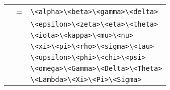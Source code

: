 \begin{isabellebody}
\begin{isamarkuptext}
\begin{center}
\begin{supertabular}{rcl}
     & = & \verb|\<alpha>|\isa{{\isachardoublequote}\ \ {\isacharbar}\ \ {\isachardoublequote}}\verb|\<beta>|\isa{{\isachardoublequote}\ \ {\isacharbar}\ \ {\isachardoublequote}}\verb|\<gamma>|\isa{{\isachardoublequote}\ \ {\isacharbar}\ \ {\isachardoublequote}}\verb|\<delta>|\isa{{\isachardoublequote}\ \ {\isacharbar}{\isachardoublequote}} \\
          &   & \verb|\<epsilon>|\isa{{\isachardoublequote}\ \ {\isacharbar}\ \ {\isachardoublequote}}\verb|\<zeta>|\isa{{\isachardoublequote}\ \ {\isacharbar}\ \ {\isachardoublequote}}\verb|\<eta>|\isa{{\isachardoublequote}\ \ {\isacharbar}\ \ {\isachardoublequote}}\verb|\<theta>|\isa{{\isachardoublequote}\ \ {\isacharbar}{\isachardoublequote}} \\
          &   & \verb|\<iota>|\isa{{\isachardoublequote}\ \ {\isacharbar}\ \ {\isachardoublequote}}\verb|\<kappa>|\isa{{\isachardoublequote}\ \ {\isacharbar}\ \ {\isachardoublequote}}\verb|\<mu>|\isa{{\isachardoublequote}\ \ {\isacharbar}\ \ {\isachardoublequote}}\verb|\<nu>|\isa{{\isachardoublequote}\ \ {\isacharbar}{\isachardoublequote}} \\
          &   & \verb|\<xi>|\isa{{\isachardoublequote}\ \ {\isacharbar}\ \ {\isachardoublequote}}\verb|\<pi>|\isa{{\isachardoublequote}\ \ {\isacharbar}\ \ {\isachardoublequote}}\verb|\<rho>|\isa{{\isachardoublequote}\ \ {\isacharbar}\ \ {\isachardoublequote}}\verb|\<sigma>|\isa{{\isachardoublequote}\ \ {\isacharbar}\ \ {\isachardoublequote}}\verb|\<tau>|\isa{{\isachardoublequote}\ \ {\isacharbar}{\isachardoublequote}} \\
          &   & \verb|\<upsilon>|\isa{{\isachardoublequote}\ \ {\isacharbar}\ \ {\isachardoublequote}}\verb|\<phi>|\isa{{\isachardoublequote}\ \ {\isacharbar}\ \ {\isachardoublequote}}\verb|\<chi>|\isa{{\isachardoublequote}\ \ {\isacharbar}\ \ {\isachardoublequote}}\verb|\<psi>|\isa{{\isachardoublequote}\ \ {\isacharbar}{\isachardoublequote}} \\
          &   & \verb|\<omega>|\isa{{\isachardoublequote}\ \ {\isacharbar}\ \ {\isachardoublequote}}\verb|\<Gamma>|\isa{{\isachardoublequote}\ \ {\isacharbar}\ \ {\isachardoublequote}}\verb|\<Delta>|\isa{{\isachardoublequote}\ \ {\isacharbar}\ \ {\isachardoublequote}}\verb|\<Theta>|\isa{{\isachardoublequote}\ \ {\isacharbar}{\isachardoublequote}} \\
          &   & \verb|\<Lambda>|\isa{{\isachardoublequote}\ \ {\isacharbar}\ \ {\isachardoublequote}}\verb|\<Xi>|\isa{{\isachardoublequote}\ \ {\isacharbar}\ \ {\isachardoublequote}}\verb|\<Pi>|\isa{{\isachardoublequote}\ \ {\isacharbar}\ \ {\isachardoublequote}}\verb|\<Sigma>|\isa{{\isachardoublequote}\ \ {\isacharbar}{\isachardoublequote}} \\

\end{supertabular}
\end{center}
\end{isamarkuptext}
\end{isabellebody}
